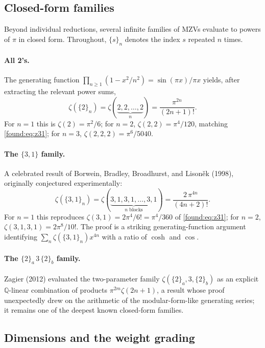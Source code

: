 \subsection*{Closed-form families}

Beyond individual reductions, several infinite families of MZVs evaluate to powers of $\pi$ in closed form. Throughout, $\{s\}_n$ denotes the index $s$ repeated $n$ times.

\paragraph{All 2's.} The generating function $\prod_{n\ge1}(1-x^2/n^2)=\sin(\pi x)/\pi x$ yields, after extracting the relevant power sums,
\begin{equation}
  \zeta(\{2\}_n)=\zeta(\underbrace{2,2,\dots,2}_{n})=\frac{\pi^{2n}}{(2n+1)!}.
  \label{found:eq:all2}
\end{equation}
For $n=1$ this is $\zeta(2)=\pi^2/6$; for $n=2$, $\zeta(2,2)=\pi^4/120$, matching \eqref{found:eq:z31}; for $n=3$, $\zeta(2,2,2)=\pi^6/5040$.

\paragraph{The $\{3,1\}$ family.} A celebrated result of Borwein, Bradley, Broadhurst, and Lison\v{e}k (1998), originally conjectured experimentally:
\begin{equation}
  \zeta(\{3,1\}_n)=\zeta(\underbrace{3,1,3,1,\dots,3,1}_{n\text{ blocks}})=\frac{2\,\pi^{4n}}{(4n+2)!}.
  \label{found:eq:bbbl31}
\end{equation}
For $n=1$ this reproduces $\zeta(3,1)=2\pi^4/6!=\pi^4/360$ of \eqref{found:eq:z31}; for $n=2$, $\zeta(3,1,3,1)=2\pi^8/10!$. The proof is a striking generating-function argument identifying $\sum_n\zeta(\{3,1\}_n)x^{4n}$ with a ratio of $\cosh$ and $\cos$.

\paragraph{The $\{2\}_a\,3\,\{2\}_b$ family.} Zagier (2012) evaluated the two-parameter family $\zeta(\{2\}_a,3,\{2\}_b)$ as an explicit $\mathbb{Q}$-linear combination of products $\pi^{2m}\zeta(2n+1)$, a result whose proof unexpectedly drew on the arithmetic of the modular-form-like generating series; it remains one of the deepest known closed-form families.

\subsection*{Dimensions and the weight grading}

